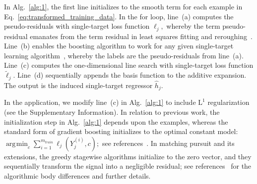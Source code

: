 \documentclass[aps,twocolumn,superscriptaddress,floatfix,preprintnumbers,showkeys]{revtex4}
\DeclareMathOperator*{\argmin}{\arg\!\min}
\begin{document}
In Alg.~\ref{alg:1}, the first line initializes to the smooth term for each example in Eq.~\ref{eq:transformed_training_data}. In the for loop, line~(a) computes the pseudo-residuals with single-target loss function $\ell_{j},$ whereby the term pseudo-residual emanates from the term residual in least squares fitting and reroughing~\cite{Tukey_1977, Friedman_2001, Friedman_2003, Hastie_2009}. Line~(b) enables the boosting algorithm to work for any given single-target learning algorithm~\cite{Friedman_2001, Friedman_2003, Hastie_2009}, whereby the labels are the pseudo-residuals from line~(a). Line~(c) computes the one-dimensional line search with single-target loss function $\tilde{\ell}_{j}.$ Line~(d) sequentially appends the basis function to the additive expansion. The output is the induced single-target regressor $\hat{h}_{j}$.

In the application, we modify line~(c) in Alg.~\ref{alg:1} to include $\mbox{L}^{1}$ regularization (see the Supplementary Information). In relation to previous work, the initialization step in Alg.~\ref{alg:1} depends upon the examples, whereas the standard form of gradient boosting initializes to the optimal constant model:\
$\argmin_{c} \sum_{i=1}^{m_{train}} \ell_{j}(Y_{j}^{(i)}, c);$ see references~\cite{Friedman_2001, Friedman_2003, Hastie_2009}. In matching pursuit and its extensions, the greedy stagewise algorithms initialize to the zero vector, and they sequentially transform the signal into a negligible residual; see references~\cite{Mallat_1993, Vincent_2002, Donoho_2012} for the algorithmic body differences and further details. 
\end{document}
